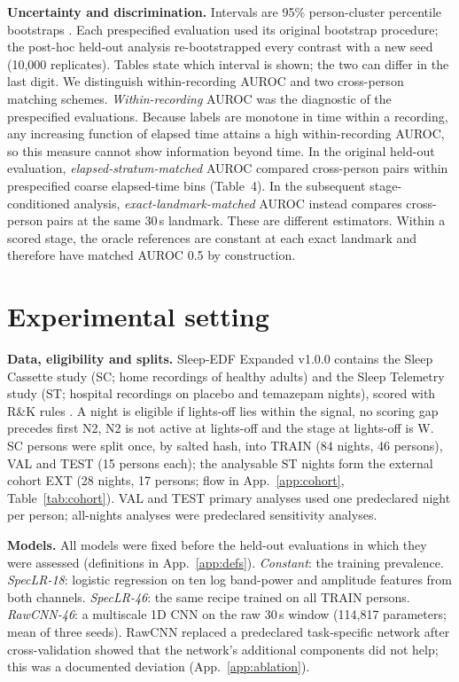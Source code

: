 \documentclass{article}
\begin{document}
\textbf{Uncertainty and discrimination.} Intervals are 95\% person-cluster percentile bootstraps \citep{davison1997bootstrap}. Each prespecified evaluation used its original bootstrap procedure; the post-hoc held-out analysis re-bootstrapped every contrast with a new seed (10{,}000 replicates). Tables state which interval is shown; the two can differ in the last digit. We distinguish within-recording AUROC and two cross-person matching schemes. \emph{Within-recording} AUROC was the diagnostic of the prespecified evaluations. Because labels are monotone in time within a recording, any increasing function of elapsed time attains a high within-recording AUROC, so this measure cannot show information beyond time. In the original held-out evaluation, \emph{elapsed-stratum-matched} AUROC compared cross-person pairs within prespecified coarse elapsed-time bins (Table~4). In the subsequent stage-conditioned analysis, \emph{exact-landmark-matched} AUROC instead compares cross-person pairs at the same 30\,s landmark. These are different estimators. Within a scored stage, the oracle references are constant at each exact landmark and therefore have matched AUROC 0.5 by construction.

\section{Experimental setting}
\label{sec:data}

\textbf{Data, eligibility and splits.} Sleep-EDF Expanded v1.0.0 \citep{kemp2000sleepedf,pollard2026physionet} contains the Sleep Cassette study (SC; home recordings of healthy adults) and the Sleep Telemetry study (ST; hospital recordings on placebo and temazepam nights), scored with R\&K rules \citep{rechtschaffen1968manual}. A night is eligible if lights-off lies within the signal, no scoring gap precedes first N2, N2 is not active at lights-off and the stage at lights-off is W. SC persons were split once, by salted hash, into TRAIN (84 nights, 46 persons), VAL and TEST (15 persons each); the analysable ST nights form the external cohort EXT (28 nights, 17 persons; flow in App.~\ref{app:cohort}, Table~\ref{tab:cohort}). VAL and TEST primary analyses used one predeclared night per person; all-nights analyses were predeclared sensitivity analyses.

\textbf{Models.} All models were fixed before the held-out evaluations in which they were assessed (definitions in App.~\ref{app:defs}). \emph{Constant}: the training prevalence. \emph{SpecLR-18}: logistic regression on ten log band-power and amplitude features from both channels. \emph{SpecLR-46}: the same recipe trained on all TRAIN persons. \emph{RawCNN-46}: a multiscale 1D CNN on the raw 30\,s window (114{,}817 parameters; mean of three seeds). RawCNN replaced a predeclared task-specific network after cross-validation showed that the network's additional components did not help; this was a documented deviation (App.~\ref{app:ablation}).
\end{document}
